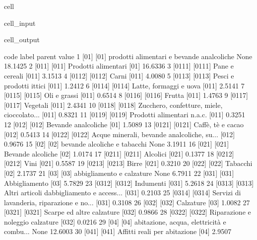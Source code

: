 \documentclass[letterpaper,10pt,english]{jupyterBook}
\begin{document}
\begin{sphinxuseclass}{cell}
\begin{sphinxVerbatimInput}
\begin{sphinxuseclass}{cell_input}
\end{sphinxuseclass}\end{sphinxVerbatimInput}
\begin{sphinxVerbatimOutput}

\begin{sphinxuseclass}{cell_output}
\begin{sphinxVerbatim}[commandchars=\\\{\}]
      code                                              label parent    value
1     [01]  [01] \PYGZhy{}\PYGZhy{} prodotti alimentari e bevande analcoliche   None  18.1425
2    [011]                          [011] Prodotti alimentari   [01]  16.6336
3   [0111]                              [0111] Pane e cereali  [011]   3.1513
4   [0112]                                       [0112] Carni  [011]   4.0080
5   [0113]                     [0113] Pesci e prodotti ittici  [011]   1.2412
6   [0114]                      [0114] Latte, formaggi e uova  [011]   2.5141
7   [0115]                                [0115] Oli e grassi  [011]   0.6514
8   [0116]                                      [0116] Frutta  [011]   1.4763
9   [0117]                                    [0117] Vegetali  [011]   2.4341
10  [0118]  [0118] Zucchero, confetture, miele, cioccolato...  [011]   0.8321
11  [0119]                  [0119] Prodotti alimentari n.a.c.  [011]   0.3251
12   [012]                          [012] Bevande analcoliche   [01]   1.5089
13  [0121]                           [0121] Caffè, tè e cacao  [012]   0.5413
14  [0122]  [0122] Acque minerali, bevande analcoliche, su...  [012]   0.9676
15    [02]               [02] \PYGZhy{}\PYGZhy{} bevande alcoliche e tabacchi   None   3.1911
16   [021]                            [021] Bevande alcoliche   [02]   1.0174
17  [0211]                                    [0211] Alcolici  [021]   0.1377
18  [0212]                                        [0212] Vini  [021]   0.5587
19  [0213]                                       [0213] Birre  [021]   0.3210
20   [022]                                     [022] Tabacchi   [02]   2.1737
21    [03]                  [03] \PYGZhy{}\PYGZhy{} abbigliamento e calzature   None   6.7911
22   [031]                                [031] Abbigliamento   [03]   5.7829
23  [0312]                                   [0312] Indumenti  [031]   5.2618
24  [0313]  [0313] Altri articoli d\PYGZsq{}abbigliamento e access...  [031]   0.2103
25  [0314]  [0314] Servizi di lavanderia, riparazione e no...  [031]   0.3108
26   [032]                                    [032] Calzature   [03]   1.0082
27  [0321]                   [0321] Scarpe ed altre calzature  [032]   0.9866
28  [0322]            [0322] Riparazione e noleggio calzature  [032]   0.0216
29    [04]  [04] \PYGZhy{}\PYGZhy{} abitazione, acqua, elettricità e combu...   None  12.6003
30   [041]                 [041] Affitti reali per abitazione   [04]   2.9507
\end{sphinxVerbatim}

\end{sphinxuseclass}\end{sphinxVerbatimOutput}

\end{sphinxuseclass}
\end{document}
